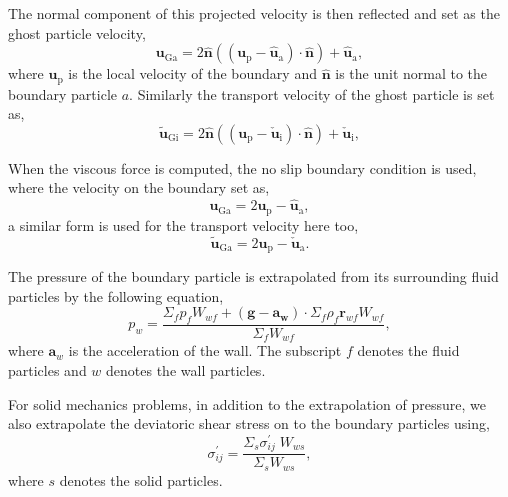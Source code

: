 \documentclass[preprint,12pt]{elsarticle}
\newcommand{\ten}[1]{\ensuremath{\mathbf{#1}}}
\begin{document}
The normal component of this projected velocity is then reflected and set as
the ghost particle velocity,
\begin{equation}
  \label{eq:free-slip-bc-u}
  \ten{u}_{\text{Ga}} = 2 \ten{\hat{n}}((\ten{u}_{\text{p}} - \ten{\hat{u}}_{\text{a}})\cdot \ten{\hat{n}}) + \ten{\hat{u}}_{\text{a}},
\end{equation}
where $\ten{u}_{\text{p}}$ is the local velocity of the boundary and
$\ten{\hat{n}}$ is the unit normal to the boundary particle $a$. Similarly the
transport velocity of the ghost particle is set as,
\begin{equation}
  \label{eq:free-slip-bc-u}
  \tilde{\ten{u}}_{\text{Gi}} = 2 \ten{\hat{n}}((\ten{u}_{\text{p}} - \ten{\check{u}}_{\text{i}})\cdot \ten{\hat{n}}) + \ten{\check{u}}_{\text{i}},
\end{equation}

When the viscous force is computed, the no slip boundary condition is used,
where the velocity on the boundary set as,
\begin{equation}
  \label{eq:no-slip-bc-u}
  \ten{u}_{\text{Ga}} = 2 \ten{u}_{\text{p}} - \ten{\hat{u}}_{\text{a}},
\end{equation}
a similar form is used for the transport velocity here too,
\begin{equation}
  \label{eq:no-slip-bc-uhat}
  \tilde{\ten{u}}_{\text{Ga}} = 2 \ten{u}_{\text{p}} - \ten{\check{u}}_{\text{a}}.
\end{equation}

The pressure of the boundary particle is extrapolated from its surrounding
fluid particles by the following equation,
\begin{equation}
  \label{eq:pressure-bc}
  p_w = \frac{\Sigma_f p_f W_{wf} + (\ten{g} - \ten{a}_{\ten{w}}) \cdot \Sigma_f
    \rho_f \ten{r}_{wf} W_{wf}}{\Sigma_f W_{wf}},
\end{equation}
where $\ten{a}_w$ is the acceleration of the wall. The subscript $f$ denotes
the fluid particles and $w$ denotes the wall particles.

For solid mechanics problems, in addition to the extrapolation of pressure, we
also extrapolate the deviatoric shear stress on to the boundary particles
using,
\begin{equation}
  \label{eq:shear-stress-bc}
  \sigma_{ij}^{'} = \frac{\Sigma_s \sigma_{ij}^{'} \; W_{ws}}{\Sigma_s W_{ws}},
\end{equation}
where $s$ denotes the solid particles.
\end{document}
